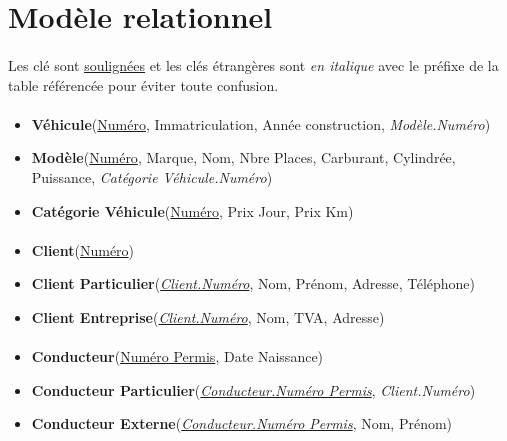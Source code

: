 \documentclass[a4paper]{article}
\newenvironment{changemargin}[2]{%
\begin{list}{}{%
\setlength{\topsep}{0pt}%
\setlength{\leftmargin}{#1}%
\setlength{\rightmargin}{#2}%
\setlength{\listparindent}{\parindent}%
\setlength{\itemindent}{\parindent}%
\setlength{\parsep}{\parskip}%
}%
\item[]}{\end{list}}
\begin{document}
\begin{changemargin}{-1cm}{-1cm}
\section{Modèle relationnel}

    \paragraph{}Les clé sont \underline{soulignées} et les clés étrangères sont
    \textit{en italique} avec le préfixe de la table référencée pour éviter 
    toute confusion.

    \paragraph{}
    \begin{itemize}
        \item \textbf{Véhicule}(\underline{Numéro}, Immatriculation,
        Année construction, \textit{Modèle.Numéro})
        \item \textbf{Modèle}(\underline{Numéro}, Marque, Nom, Nbre Places,
        Carburant, Cylindrée, Puissance, \textit{Catégorie Véhicule.Numéro})
        \item \textbf{Catégorie Véhicule}(\underline{Numéro}, Prix Jour,
        Prix Km)
    \end{itemize}

    \paragraph{}
    \begin{itemize}
        \item \textbf{Client}(\underline{Numéro})
        \item \textbf{Client Particulier}(\textit{\underline{Client.Numéro}},
        Nom, Prénom, Adresse, Téléphone)
        \item \textbf{Client Entreprise}(\textit{\underline{Client.Numéro}},
        Nom, TVA, Adresse)
    \end{itemize}

    \paragraph{}
    \begin{itemize}
        \item \textbf{Conducteur}(\underline{Numéro Permis}, Date Naissance)
        \item \textbf{Conducteur Particulier}(\textit{\underline{Conducteur.Numéro Permis}},
        \textit{Client.Numéro})
        \item \textbf{Conducteur Externe}(\textit{\underline{Conducteur.Numéro Permis}},
        Nom, Prénom)
    \end{itemize}


\end{changemargin}
\end{document}

